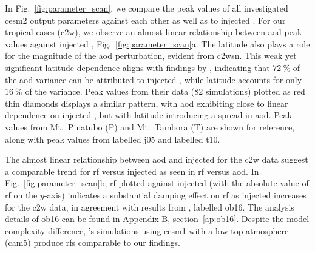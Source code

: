 \documentclass{ametsocV6.1}
\newcommand{\iso}[1][i]{{#1}njected \ce{SO2}}
\begin{document}
In Fig.~\ref{fig:parameter_scan}, we compare the peak values of all investigated \gls{cesm2} output parameters against each other as well as to \iso{}.
For our tropical cases (\gls{c2w}), we observe an almost linear relationship between \gls{aod} peak values
against \iso{}, Fig.~\ref{fig:parameter_scan}a. The latitude also plays a role for the magnitude of the \gls{aod}
perturbation, evident from \gls{c2wsn}. This weak yet significant latitude dependence
aligns with findings by \citet{marshall2019}, indicating that \(\SI{72}{\percent}\) of
the \gls{aod} variance can be attributed to \iso{}, while latitude accounts for only
\(\SI{16}{\percent}\) of the variance. Peak values from their data (82 simulations)
plotted as red thin diamonds displays a similar pattern, with \gls{aod} exhibiting close
to linear dependence on \iso{}, but with latitude introducing a spread in \gls{aod}.
Peak values from Mt.\ Pinatubo (P) and Mt.\ Tambora (T) are shown for reference, along
with peak values from \citet{jones2005} labelled \gls{j05} and \citet{timmreck2010}
labelled \gls{t10}.

The almost linear relationship between \gls{aod} and \iso{} for the \gls{c2w} data
suggest a comparable trend for \gls{rf} versus \iso{} as seen in \gls{rf} versus
\gls{aod}. In Fig.~\ref{fig:parameter_scan}b, \gls{rf} plotted against \iso{} (with the
absolute value of \gls{rf} on the \(y\)-axis) indicates a substantial damping effect on
\gls{rf} as \iso{} increases for the \gls{c2w} data, in agreement with results from
\citet{ottobliesner2016}, labelled \gls{ob16}. The analysis details of \gls{ob16} can be
found in Appendix B, section~\ref{ap:ob16}. Despite the model complexity difference,
\citet{ottobliesner2016}'s simulations using \gls{cesm1} with a low-top atmosphere
(\gls{cam5}) produce \glspl{rf} comparable to our findings.
\end{document}
